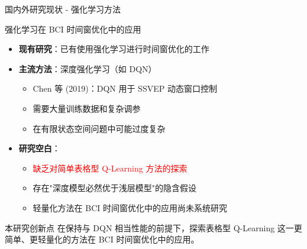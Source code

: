 \documentclass[aspectratio=169, 10pt]{beamer}
\begin{document}
\begin{frame}{国内外研究现状 - 强化学习方法}
\begin{block}{强化学习在 BCI 时间窗优化中的应用}
\begin{itemize}
    \item \textbf{现有研究}：已有使用强化学习进行时间窗优化的工作
    \item \textbf{主流方法}：深度强化学习（如 DQN）
    \begin{itemize}
        \item Chen 等 (2019)：DQN 用于 SSVEP 动态窗口控制
        \item 需要大量训练数据和复杂调参
        \item 在有限状态空间问题中可能过度复杂
    \end{itemize}
    \item \textbf{研究空白}：
    \begin{itemize}
        \item \textcolor{red}{缺乏对简单表格型 Q-Learning 方法的探索}
        \item 存在"深度模型必然优于浅层模型"的隐含假设
        \item 轻量化方法在 BCI 时间窗优化中的应用尚未系统研究
    \end{itemize}
\end{itemize}
\end{block}

\vspace{0.3cm}
\begin{alertblock}{本研究创新点}
在保持与 DQN 相当性能的前提下，探索表格型 Q-Learning 这一更简单、更轻量化的方法在 BCI 时间窗优化中的应用。
\end{alertblock}
\end{frame}
\end{document}
